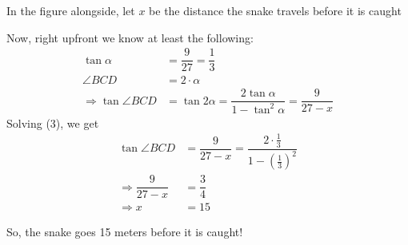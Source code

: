 \begin{solution}[\fullpage]
	In the figure alongside, let $x$ be the distance the snake travels before
	it is caught
	
	Now, right upfront we know at least the following:
	\begin{align}
		\tan\alpha &= \dfrac{9}{27} = \dfrac{1}{3} \\
		\angle BCD &= 2\cdot\alpha \\
	    \Rightarrow \tan\angle BCD &= \tan 2\alpha = \dfrac{2\tan\alpha}{1-\tan^2\alpha}
	                               = \dfrac{9}{27-x}
	\end{align}
	Solving (3), we get 
	\begin{align}
		\tan\angle BCD &= \dfrac{9}{27-x} = \dfrac{2\cdot\frac{1}{3}}{1-(\frac{1}{3})^2} \\
		\Rightarrow \dfrac{9}{27-x} &= \dfrac{3}{4} \\
		\Rightarrow x &= 15
	\end{align}
	
	So, the snake goes 15 meters before it is caught!
	
	
\end{solution}
